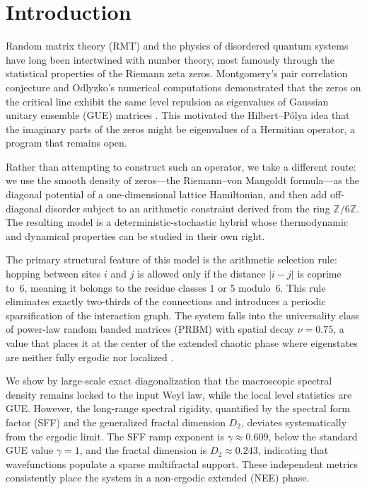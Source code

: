 \documentclass[11pt,a4paper]{article}
\begin{document}
\begin{abstract}
\vspace{1em}
\noindent \textbf{Keywords:} Quantum Chaos, Non-ergodic Extended Phase, Power-law Random Banded Matrices, Noncommutative Geometry, Anderson Localization, Formal Verification.
\end{abstract}

\section{Introduction}
\label{sec:introduction}

Random matrix theory (RMT) and the physics of disordered quantum systems have long been intertwined with number theory, most famously through the statistical properties of the Riemann zeta zeros. Montgomery's pair correlation conjecture and Odlyzko's numerical computations demonstrated that the zeros on the critical line exhibit the same level repulsion as eigenvalues of Gaussian unitary ensemble (GUE) matrices \cite{Montgomery1973,Odlyzko2001}. This motivated the Hilbert--P\'olya idea that the imaginary parts of the zeros might be eigenvalues of a Hermitian operator, a program that remains open.

Rather than attempting to construct such an operator, we take a different route: we use the smooth density of zeros---the Riemann--von Mangoldt formula---as the diagonal potential of a one-dimensional lattice Hamiltonian, and then add off-diagonal disorder subject to an arithmetic constraint derived from the ring $\mathbb{Z}/6\mathbb{Z}$. The resulting model is a deterministic-stochastic hybrid whose thermodynamic and dynamical properties can be studied in their own right.

The primary structural feature of this model is the arithmetic selection rule: hopping between sites $i$ and $j$ is allowed only if the distance $|i-j|$ is coprime to~6, meaning it belongs to the residue classes $1$ or $5$ modulo~6. This rule eliminates exactly two-thirds of the connections and introduces a periodic sparsification of the interaction graph. The system falls into the universality class of power-law random banded matrices (PRBM) with spatial decay $\nu=0.75$, a value that places it at the center of the extended chaotic phase where eigenstates are neither fully ergodic nor localized \cite{Mirlin1996}.

We show by large-scale exact diagonalization that the macroscopic spectral density remains locked to the input Weyl law, while the local level statistics are GUE. However, the long-range spectral rigidity, quantified by the spectral form factor (SFF) and the generalized fractal dimension $D_2$, deviates systematically from the ergodic limit. The SFF ramp exponent is $\gamma \approx 0.609$, below the standard GUE value $\gamma=1$, and the fractal dimension is $D_2 \approx 0.243$, indicating that wavefunctions populate a sparse multifractal support. These independent metrics consistently place the system in a non-ergodic extended (NEE) phase.
\end{document}
